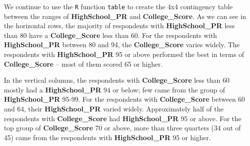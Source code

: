 \documentclass[
]{article}
\newenvironment{Shaded}{\begin{snugshade}}{\end{snugshade}}
\newcommand{\AttributeTok}[1]{\textcolor[rgb]{0.77,0.63,0.00}{#1}}
\newcommand{\CommentTok}[1]{\textcolor[rgb]{0.56,0.35,0.01}{\textit{#1}}}
\newcommand{\ControlFlowTok}[1]{\textcolor[rgb]{0.13,0.29,0.53}{\textbf{#1}}}
\newcommand{\DecValTok}[1]{\textcolor[rgb]{0.00,0.00,0.81}{#1}}
\newcommand{\FunctionTok}[1]{\textcolor[rgb]{0.00,0.00,0.00}{#1}}
\newcommand{\NormalTok}[1]{#1}
\newcommand{\OtherTok}[1]{\textcolor[rgb]{0.56,0.35,0.01}{#1}}
\newcommand{\SpecialCharTok}[1]{\textcolor[rgb]{0.00,0.00,0.00}{#1}}
\newcommand{\StringTok}[1]{\textcolor[rgb]{0.31,0.60,0.02}{#1}}
\begin{document}
\begin{Shaded}
\end{Shaded}

We continue to use the \texttt{R} function \texttt{table} to create the
4x4 contingency table between the ranges of \textbf{HighSchool\_PR} and
\textbf{College\_Score}. As we can see in the horizontal rows, the
majority of respondents with \textbf{HighSchool\_PR} less than 80 have a
\textbf{College\_Score} less than 60. For the respondents with
\textbf{HighSchool\_PR} between 80 and 94, the \textbf{College\_Score}
varies widely. The respondents with \textbf{HighSchool\_PR} 95 or above
performed the best in terms of \textbf{College\_Score} -- most of them
scored 65 or higher.

In the vertical columns, the respondents with \textbf{College\_Score}
less than 60 mostly had a \textbf{HighSchool\_PR} 94 or below; few came
from the group of \textbf{HighSchool\_PR} 95-99. For the respondents
with \textbf{College\_Score} between 60 and 64, their
\textbf{HighSchool\_PR} varied widely. Approximately half of the
respondents with \textbf{College\_Score} had \textbf{HighSchool\_PR} 95
or above. For the top group of \textbf{College\_Score} 70 or above, more
than three quarters (34 out of 45) came from the respondents with
\textbf{HighSchool\_PR} 95 or higher.

\begin{Shaded}
\end{Shaded}
\end{document}
